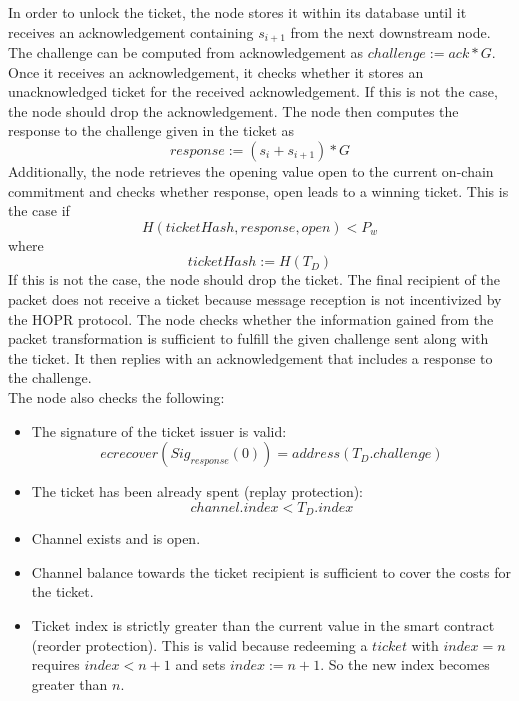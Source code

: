 In order to unlock the ticket, the node stores it within its database until it receives an acknowledgement containing $s_{i+1}$ from the next downstream node. 
The challenge can be computed from acknowledgement as $challenge:=ack*G$.
\newline Once it receives an acknowledgement, it checks whether it stores an unacknowledged ticket for the received acknowledgement. 
If this is not the case, the node should drop the acknowledgement.  
\newline The node then computes the response to the challenge given in the ticket as $$response:=(s_i+s_{i+1})*G$$
Additionally, the node retrieves the opening value open to the current on-chain commitment and checks whether response, open leads to a winning ticket. 
This is the case if $$H( ticketHash, response, open ) <P_w$$ where $$ticketHash:=H(T_D)$$
If this is not the case, the node should drop the ticket. 
The final recipient of the packet does not receive a ticket because message reception is not incentivized by the HOPR protocol.
\newline The node checks whether the information gained from the packet transformation is sufficient to fulfill the given challenge sent along with the ticket. It then replies with an acknowledgement that includes a response to the challenge.
\\ The node also checks the following:
\begin{itemize}
    \item The signature of the ticket issuer is valid: $$ecrecover(Sig_{response}(0))=address(T_D.challenge)$$
    \item The ticket has been already spent (replay protection): $$channel.index <T_D.index$$
    \item Channel exists and is open.
    \item Channel balance towards the ticket recipient is sufficient to cover the costs for the ticket.
    \item Ticket index is strictly greater than the current value in the smart contract (reorder protection). This is valid because redeeming a $ticket$ with $index=n$ requires $index < n+1$ and sets $index := n+1$. So the new index becomes greater than $n$.


\end{itemize}  








